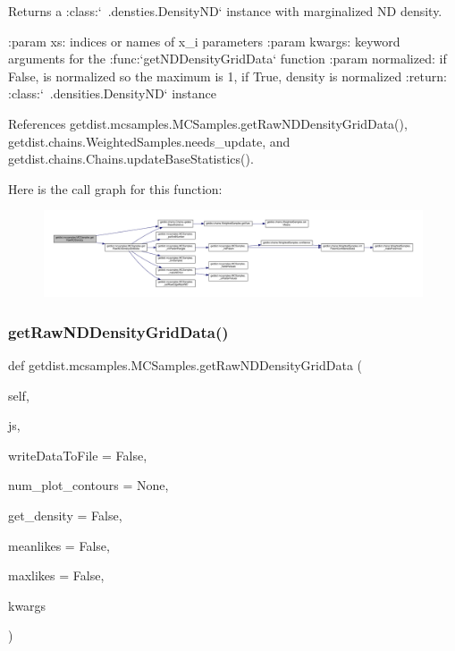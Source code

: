 \begin{DoxyVerb}Returns a :class:`~.densties.DensityND` instance with marginalized ND density.

:param xs: indices or names of x_i parameters
:param kwargs: keyword arguments for the :func:`getNDDensityGridData` function
:param normalized: if False, is normalized so the maximum is 1, if True, density is normalized
:return: :class:`~.densities.DensityND` instance
\end{DoxyVerb}
 

References getdist.\+mcsamples.\+M\+C\+Samples.\+get\+Raw\+N\+D\+Density\+Grid\+Data(), getdist.\+chains.\+Weighted\+Samples.\+needs\+\_\+update, and getdist.\+chains.\+Chains.\+update\+Base\+Statistics().

Here is the call graph for this function\+:
\nopagebreak
\begin{figure}[H]
\begin{center}
\leavevmode
\includegraphics[width=350pt]{classgetdist_1_1mcsamples_1_1MCSamples_a35fd7d8a3b07a70a66a013e9cb265c95_cgraph}
\end{center}
\end{figure}
\mbox{\label{classgetdist_1_1mcsamples_1_1MCSamples_a8a54d102a9c5428e83651b3585f0e148}} 
\subsubsection{\texorpdfstring{get\+Raw\+N\+D\+Density\+Grid\+Data()}{getRawNDDensityGridData()}}
{\footnotesize\ttfamily def getdist.\+mcsamples.\+M\+C\+Samples.\+get\+Raw\+N\+D\+Density\+Grid\+Data (\begin{DoxyParamCaption}\item[{}]{self,  }\item[{}]{js,  }\item[{}]{write\+Data\+To\+File = {\ttfamily False},  }\item[{}]{num\+\_\+plot\+\_\+contours = {\ttfamily None},  }\item[{}]{get\+\_\+density = {\ttfamily False},  }\item[{}]{meanlikes = {\ttfamily False},  }\item[{}]{maxlikes = {\ttfamily False},  }\item[{}]{kwargs }\end{DoxyParamCaption})}

